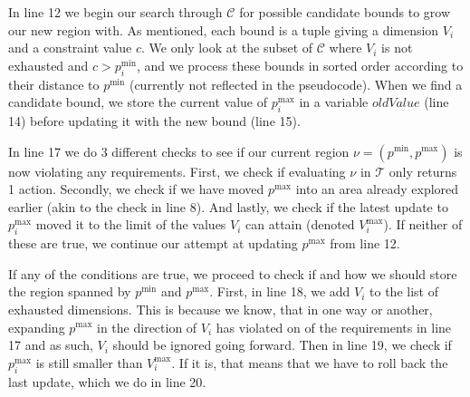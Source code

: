 In line 12 we begin our search through $\mathcal{C}$ for possible candidate
bounds to grow our new region with. As mentioned, each bound is a tuple giving a
dimension $V_i$ and a constraint value $c$. We only look at the subset of
$\mathcal{C}$ where $V_i$ is not exhausted and $c > p^{\min}_i$, and we process
these bounds in sorted order according to their distance to $p^{\min}$
(currently not reflected in the pseudocode). When we find a candidate bound, we
store the current value of $p^{\max}_i$ in a variable $oldValue$ (line 14)
before updating it with the new bound (line 15).

In line 17 we do 3 different checks to see if our current region $\nu =
(p^{\min}, p^{\max})$ is now violating any requirements. First, we check if
evaluating $\nu$ in $\mathcal{T}$ only returns 1 action.  Secondly, we check if
we have moved $p^{\max}$ into an area already explored earlier (akin to the
check in line 8). And lastly, we check if the latest update to $p^{\max}_i$
moved it to the limit of the values $V_i$ can attain (denoted $V^{\max}_i$). If
neither of these are true, we continue our attempt at updating $p^{\max}$ from
line 12.

If any of the conditions are true, we proceed to check if and how we should
store the region spanned by $p^{\min}$ and $p^{\max}$. First, in line 18, we add
$V_i$ to the list of exhausted dimensions. This is because we know, that in one
way or another, expanding $p^{\max}$ in the direction of $V_i$ has violated on
of the requirements in line 17 and as such, $V_i$ should be ignored going
forward. Then in line 19, we check if $p^{\max}_i$ is still smaller than
$V^{\max}_i$. If it is, that means that we have to roll back the last update,
which we do in line 20.

